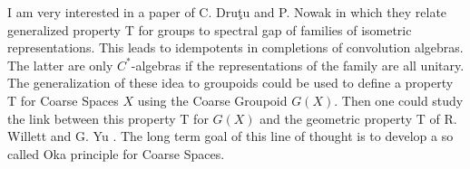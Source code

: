 I am very interested in a paper of C. Dru{\c{t}}u and P. Nowak \cite{DrutuNowak} in which they relate generalized property T for groups to spectral gap of families of isometric representations. This leads to idempotents in completions of convolution algebras. The latter are only $C^*$-algebras if the representations of the family are all unitary. The generalization of these idea to groupoids could be used to define a property T for Coarse Spaces $X$ using the Coarse Groupoid $G(X)$. Then one could study the link between this property T for $G(X)$ and the geometric property T of R. Willett and G. Yu \cite{WY}. The long term goal of this line of thought is to develop a so called Oka principle for Coarse Spaces.\\

      
